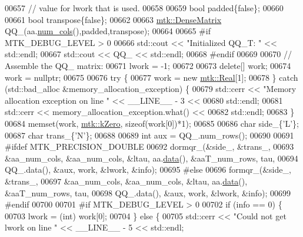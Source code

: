 \begin{DoxyCode}
00657   \textcolor{comment}{// value for lwork that is used.}
00658 
00659   \textcolor{keywordtype}{bool} padded\{\textcolor{keyword}{false}\};
00660 
00661   \textcolor{keywordtype}{bool} transpose\{\textcolor{keyword}{false}\};
00662 
00663   \hyperlink{classmtk_1_1DenseMatrix}{mtk::DenseMatrix} QQ\_(aa.\hyperlink{classmtk_1_1DenseMatrix_a41747502d468c6728a4be31501b16e0e}{num\_cols}(),padded,transpose);
00664 
00665 \textcolor{preprocessor}{  #if MTK\_DEBUG\_LEVEL > 0}
00666   std::cout << \textcolor{stringliteral}{"Initialized QQ\_T: "} << std::endl;
00667   std::cout << QQ\_ << std::endl;
00668 \textcolor{preprocessor}{  #endif}
00669 
00670   \textcolor{comment}{// Assemble the QQ\_ matrix:}
00671   lwork = -1;
00672 
00673   \textcolor{keyword}{delete}[] work;
00674   work = \textcolor{keyword}{nullptr};
00675 
00676   \textcolor{keywordflow}{try} \{
00677     work = \textcolor{keyword}{new} \hyperlink{group__c01-roots_gac080bbbf5cbb5502c9f00405f894857d}{mtk::Real}[1];
00678   \} \textcolor{keywordflow}{catch} (std::bad\_alloc &memory\_allocation\_exception) \{
00679     std::cerr << \textcolor{stringliteral}{"Memory allocation exception on line "} << \_\_LINE\_\_ - 3 <<
00680       std::endl;
00681     std::cerr << memory\_allocation\_exception.what() <<
00682       std::endl;
00683   \}
00684   memset(work, \hyperlink{group__c01-roots_ga59a451a5fae30d59649bcda274fea271}{mtk::kZero}, \textcolor{keyword}{sizeof}(work[0])*1);
00685 
00686   \textcolor{keywordtype}{char} side\_\{\textcolor{charliteral}{'L'}\};
00687   \textcolor{keywordtype}{char} trans\_\{\textcolor{charliteral}{'N'}\};
00688 
00689   \textcolor{keywordtype}{int} aux = QQ\_.num\_rows();
00690 
00691 \textcolor{preprocessor}{  #ifdef MTK\_PRECISION\_DOUBLE}
00692   dormqr\_(&side\_, &trans\_,
00693           &aa\_num\_cols, &aa\_num\_cols, &ltau, aa.\hyperlink{classmtk_1_1DenseMatrix_a0c33b8a9e01d157c61ddbdf807c25d84}{data}(), &aaT\_num\_rows, tau,
00694           QQ\_.data(), &aux, work, &lwork, &info);
00695 \textcolor{preprocessor}{  #else}
00696   formqr\_(&side\_, &trans\_,
00697           &aa\_num\_cols, &aa\_num\_cols, &ltau, aa.\hyperlink{classmtk_1_1DenseMatrix_a0c33b8a9e01d157c61ddbdf807c25d84}{data}(), &aaT\_num\_rows, tau,
00698           QQ\_.data(), &aux, work, &lwork, &info);
00699 \textcolor{preprocessor}{  #endif}
00700 
00701 \textcolor{preprocessor}{  #if MTK\_DEBUG\_LEVEL > 0}
00702   \textcolor{keywordflow}{if} (info == 0) \{
00703     lwork = (int) work[0];
00704   \} \textcolor{keywordflow}{else} \{
00705     std::cerr << \textcolor{stringliteral}{"Could not get lwork on line "} << \_\_LINE\_\_ - 5 << std::endl;

\end{DoxyCode}
